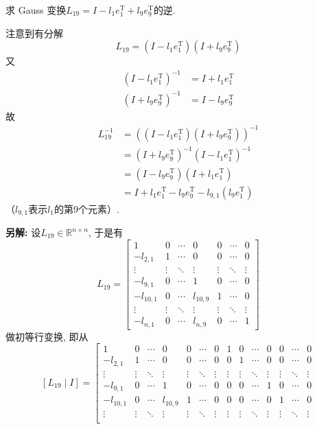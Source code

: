 \documentclass[12pt, answers]{exam}     %
\newcommand{\anothersolution}{\par\noindent\textbf{另解:}}
\newcommand{\R}{\mathbb{R}}
\newcommand{\T}{\mathrm{T}}
\begin{document}
\begin{questions}
\question{}
求 Gauss 变换$L_{19} = I - l_1e_1^{\T} + l_9e_9^{\T} $的逆. 

\begin{solution}
注意到有分解
\[
L_{19} = (I - l_1 e_1^{\T})(I + l_9 e_9^{\T})
\]
又
\begin{align*}
(I - l_1 e_1^{\T})^{-1} &= I + l_1 e_1^{\T} \\
(I + l_9 e_9^{\T})^{-1} &= I - l_9 e_9^{\T}
\end{align*}
故
\begin{align*}
L_{19}^{-1} &= \left((I - l_1 e_1^{\T})(I + l_9 e_9^{\T})\right)^{-1} \\
&= (I + l_9 e_9^{\T})^{-1}(I - l_1 e_1^{\T})^{-1} \\
&= (I - l_9 e_9^{\T})(I + l_1 e_1^{\T}) \\
&= I + l_1 e_1^{\T} - l_9 e_9^{\T} - l_{9,1} (l_9 e_1^{\T})
\end{align*}
（$l_{9,1}$表示$l_1$的第9个元素）.
\anothersolution{}
设$L_{19} \in \R^{n \times n}$, 于是有
\[
L_{19} = \begin{bmatrix}
1 & 0 & \cdots & 0 & 0 & \cdots & 0 \\
-l_{2,1} & 1 & \cdots & 0 & 0 & \cdots & 0 \\
\vdots & \vdots & \ddots & \vdots & \vdots & \ddots & \vdots \\
-l_{9,1} & 0 & \cdots & 1 & 0 & \cdots & 0 \\
-l_{10,1} & 0 & \cdots & l_{10,9} & 1 & \cdots & 0 \\
\vdots & \vdots & \ddots & \vdots & \vdots & \ddots & \vdots \\
-l_{n,1} & 0 & \cdots & l_{n,9} & 0 & \cdots & 1
\end{bmatrix}
\]
做初等行变换, 即从
\[
[L_{19} \mid I] = 
\left[
\begin{array}{ccccccc|ccccccc}
1 & 0 & \cdots & 0 & 0 & \cdots & 0 & 1 & 0 & \cdots & 0 & 0 & \cdots & 0 \\
-l_{2,1} & 1 & \cdots & 0 & 0 & \cdots & 0 & 0 & 1 & \cdots & 0 & 0 & \cdots & 0 \\
\vdots & \vdots & \ddots & \vdots & \vdots & \ddots & \vdots & \vdots & \vdots & \ddots & \vdots & \vdots & \ddots & \vdots \\
-l_{9,1} & 0 & \cdots & 1 & 0 & \cdots & 0 & 0 & 0 & \cdots & 1 & 0 & \cdots & 0 \\
-l_{10,1} & 0 & \cdots & l_{10,9} & 1 & \cdots & 0 & 0 & 0 & \cdots & 0 & 1 & \cdots & 0 \\
\vdots & \vdots & \ddots & \vdots & \vdots & \ddots & \vdots & \vdots & \vdots & \ddots & \vdots & \vdots & \ddots & \vdots \\

\end{array}\]
\end{solution}
\end{questions}
\end{document}
